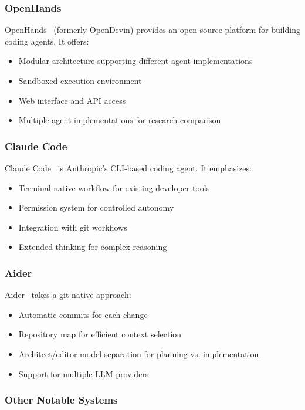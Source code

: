 \subsubsection{OpenHands}

OpenHands~\citep{wang2024opendevin} (formerly OpenDevin) provides an open-source platform for building coding agents. It offers:
\begin{itemize}
    \item Modular architecture supporting different agent implementations
    \item Sandboxed execution environment
    \item Web interface and API access
    \item Multiple agent implementations for research comparison
\end{itemize}

\subsubsection{Claude Code}

Claude Code~\citep{anthropic2024claudecode} is Anthropic's CLI-based coding agent. It emphasizes:
\begin{itemize}
    \item Terminal-native workflow for existing developer tools
    \item Permission system for controlled autonomy
    \item Integration with git workflows
    \item Extended thinking for complex reasoning
\end{itemize}

\subsubsection{Aider}

Aider~\citep{gauthier2024aider} takes a git-native approach:
\begin{itemize}
    \item Automatic commits for each change
    \item Repository map for efficient context selection
    \item Architect/editor model separation for planning vs. implementation
    \item Support for multiple LLM providers
\end{itemize}

\subsubsection{Other Notable Systems}

